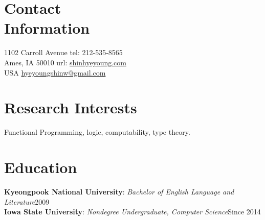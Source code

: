 \documentclass[margin,line]{resume}
\begin{document}
\newcommand{\Hawaii}{Hawai\kern.05em`\kern.05em\relax i}
\newcommand{\Manoa}{M\=anoa}
\newcommand{\Textron}[1]{\emph{Textron Systems Technical Report.} \hfill Kihei, #1}
\newcommand{\nosmall}{}



\begin{resume}

    \section{\mysidestyle Contact\\Information}
     1102 Carroll Avenue            \hfill tel: 212-535-8565\\
     Ames, IA 50010                 \hfill url: \href{shinhyeyoung.com}{shinhyeyoung.com}\\
     USA  \hfill             \hfill \href{mailto:hyeyoungshinw@gmail.com}{hyeyoungshinw@gmail.com}

    \section{\mysidestyle Research Interests}

    Functional Programming, logic, computability, type theory.
    
    \section{\mysidestyle Education}

    \noindent
    \textbf{Kyeongpook National University}:  %
    \textsl{Bachelor of English Language and Literature}\hfill 2009\\
    
    \noindent
    \textbf{Iowa State University}:  %
    \textsl{Nondegree Undergraduate, Computer Science}\hfill Since 2014\\
   

\end{resume}
\end{document}
